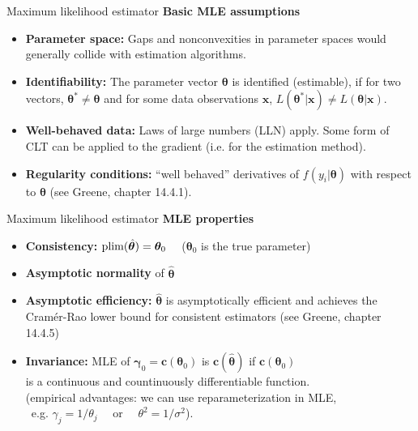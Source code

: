 \documentclass{beamer}
\begin{document}
\begin{frame}{Maximum likelihood estimator}
\textbf{Basic MLE assumptions}\\ \medskip
\begin{itemize}
    \item \textbf{Parameter space:} Gaps and nonconvexities in parameter spaces would generally collide with estimation algorithms.
    \item \textbf{Identifiability:} The parameter vector $\bm{\theta}$ is identified (estimable), if for two vectors, $\bm{\theta}^{*} \neq \bm{\theta}$ and for some data observations $\bm{x}$, $L(\bm{\theta}^{*}|\bm{x}) \neq L(\bm{\theta}|\bm{x})$.
    \item \textbf{Well-behaved data:} Laws of large numbers (LLN) apply. Some form of CLT can be applied to the gradient (i.e. for the estimation method).
    \item \textbf{Regularity conditions:} ``well behaved'' derivatives of $f(y_i|\bm{\theta})$ with respect to $\bm{\theta}$ (see Greene, chapter 14.4.1).
\end{itemize}
\end{frame}
\begin{frame}{Maximum likelihood estimator}
\textbf{MLE properties}\\ \medskip
\begin{itemize}
    \item \textbf{Consistency:} $\textnormal{plim}(\hat{\bm{\theta}}) = \bm{\theta}_0$ ~~($\bm{\theta}_0$ is the true parameter)
    \medskip
    \item \textbf{Asymptotic normality} of $\bm{\hat{\theta}}$
    \medskip
    \item \textbf{Asymptotic efficiency:}  $\bm{\hat{\theta}}$ is asymptotically efficient and achieves the Cramér-Rao lower bound for consistent estimators (see Greene, chapter 14.4.5)
    \medskip
    \item \textbf{Invariance:} MLE of $\bm{\gamma}_0=\bm{c}(\bm{\theta}_0)$ is $\bm{c}(\bm{\hat{\theta}})$ if $\bm{c}(\bm{\theta}_0)$ \\is a continuous and countinuously differentiable function.\\ \smallskip \footnotesize{ 
    (empirical advantages: we can use reparameterization in MLE, \\~e.g. $\gamma_j = 1/\theta_j$ ~~or~~ $\theta^2 = 1/\sigma^2$).}
\end{itemize}
\end{frame}
\end{document}
